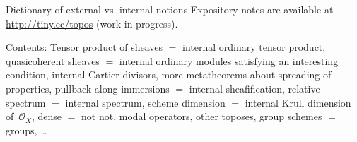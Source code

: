 \documentclass[table]{beamer}
\renewcommand{\O}{\mathcal{O}}
\begin{document}
\begin{frame}[t]
\begin{columns}[t]
\begin{column}{0.3\textwidth}
  \vspace{1cm}
  \begin{alertblock}{Dictionary of external vs. internal notions}
    Expository notes are available at \url{http://tiny.cc/topos} (work in
    progress).
  \end{alertblock}
  \tiny\rmfamily\justifying
  Contents:
  Tensor product of sheaves $=$ internal ordinary tensor product,
  quasicoherent sheaves $=$ internal ordinary modules satisfying an interesting
  condition,
  internal Cartier divisors,
  more metatheorems about spreading of properties,
  pullback along immersions $=$ internal sheafification,
  relative spectrum $=$ internal spectrum,
  scheme dimension $=$ internal Krull dimension of~$\O_X$,
  dense $=$ not not,
  modal operators,
  other toposes,
  group schemes $=$ groups,
  \ldots
\end{column}

\end{columns}\end{frame}
\end{document}
